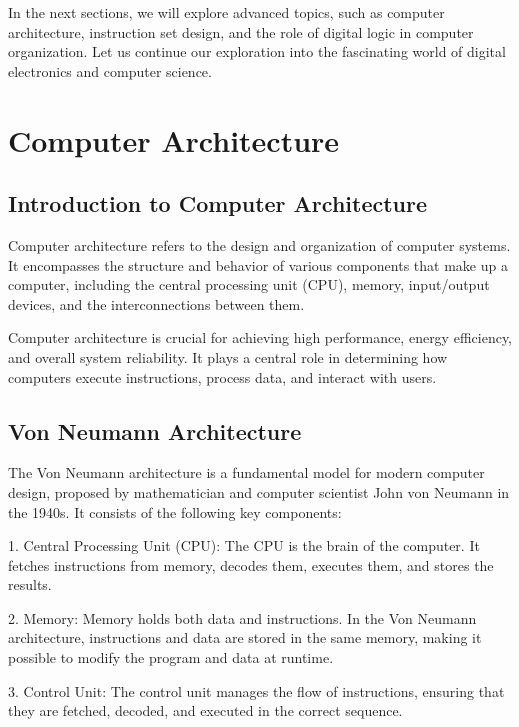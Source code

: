\documentclass{article}
\begin{document}
In the next sections, we will explore advanced topics, such as computer architecture, instruction set design, and the role of digital logic in computer organization. Let us continue our exploration into the fascinating world of digital electronics and computer science.

\newpage

\section{Computer Architecture}

\subsection{Introduction to Computer Architecture}

Computer architecture refers to the design and organization of computer systems. It encompasses the structure and behavior of various components that make up a computer, including the central processing unit (CPU), memory, input/output devices, and the interconnections between them.

Computer architecture is crucial for achieving high performance, energy efficiency, and overall system reliability. It plays a central role in determining how computers execute instructions, process data, and interact with users.

\subsection{Von Neumann Architecture}

The Von Neumann architecture is a fundamental model for modern computer design, proposed by mathematician and computer scientist John von Neumann in the 1940s. It consists of the following key components:

1. Central Processing Unit (CPU): The CPU is the brain of the computer. It fetches instructions from memory, decodes them, executes them, and stores the results.

2. Memory: Memory holds both data and instructions. In the Von Neumann architecture, instructions and data are stored in the same memory, making it possible to modify the program and data at runtime.

3. Control Unit: The control unit manages the flow of instructions, ensuring that they are fetched, decoded, and executed in the correct sequence.
\end{document}
